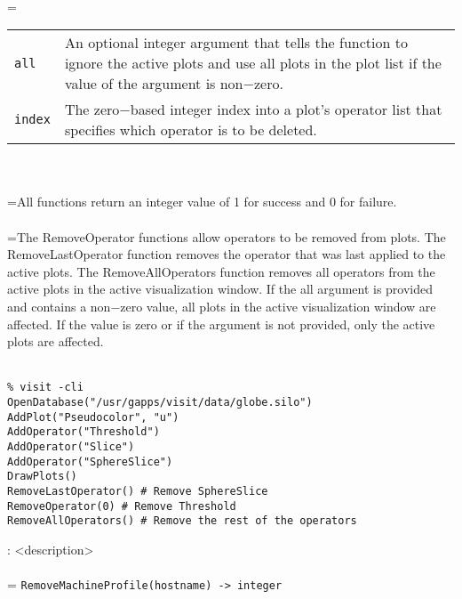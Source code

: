 \documentclass[10pt,a4paper]{report}
\begin{document}
 \\ 
\hangindent=\parindent 
\begin{tabular}{lp{9cm}}
\verb!all! & An optional integer argument that tells the function to ignore the active plots and use all plots in the plot list if the value of the argument is non$-$zero. \\
\verb!index! & The zero$-$based integer index into a plot's operator list that specifies which operator is to be deleted. \\
\end{tabular} \\[-2mm]


 \\ 
\hangindent=\parindent All functions return an integer value of 1 for success and 0 for failure. \\[-3mm] 

 \\ 
\hangindent=\parindent The RemoveOperator functions allow operators to be removed from plots. The RemoveLastOperator function removes the operator that was last applied to the active plots. The RemoveAllOperators function removes all operators from the active plots in the active visualization window. If the all argument is provided and contains a non$-$zero value, all plots in the active visualization window are affected. If the value is zero or if the argument is not provided, only the active plots are affected. \\[-3mm] 

\\[-6mm]
\begin{verbatim}% visit -cli
OpenDatabase("/usr/gapps/visit/data/globe.silo")
AddPlot("Pseudocolor", "u")
AddOperator("Threshold")
AddOperator("Slice")
AddOperator("SphereSlice")
DrawPlots()
RemoveLastOperator() # Remove SphereSlice
RemoveOperator(0) # Remove Threshold
RemoveAllOperators() # Remove the rest of the operators
\end{verbatim}
\newpage


{}
: <description>\\[-3mm]

 \\ 
\hangindent=\parindent 
\verb!RemoveMachineProfile(hostname) -> integer!\\ [-3mm]
\end{document}
